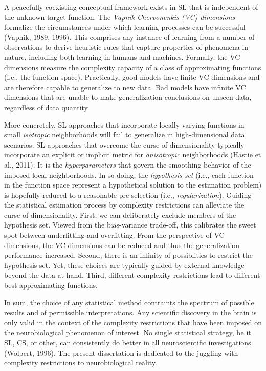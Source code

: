 \documentclass[authoryear,review,3p]{elsarticle}
\begin{document}
A peacefully coexisting conceptual framework exists in SL
that is independent
of the unknown target function.
The \textit{Vapnik-Chervonenkis (VC) dimensions}
formalize the circumstances
under which learning processes can be successful (Vapnik, 1989, 1996).
This comprises any instance of learning
from a number of observations
to derive heuristic rules that capture properties of phenomena in nature,
including both learning in humans and machines.
Formally, the VC dimensions measure the
complexity capacity of a class of approximating functions
(i.e., the function space). 
%
Practically, good models have finite VC dimensions
and are therefore capable to generalize to new data.
Bad models have infinite VC dimensions that
are unable to make generalization conclusions on unseen data,
regardless of data quantity.



More concretely,
SL approaches that incorporate locally varying functions
in small \textit{isotropic} neighborhoods
will fail to generalize in high-dimensional data scenarios.
SL approaches that overcome the curse of dimensionality typically
incorporate an explicit or implicit metric for
\textit{anisotropic} neighborhoods
(Hastie et al., 2011).
%
It is the \textit{hyperparameters} that govern the
smoothing behavior of the imposed local neighborhoods.
%
In so doing,
the \textit{hypothesis set} (i.e., each function in the function space
represent a hypothetical solution to
the estimation problem) is hopefully reduced to
a reasonable pre-selection (i.e., \textit{regularization}).
%
Guiding the statistical estimation process by
complexity restrictions can alleviate the curse of dimensionality.
First,
we can deliberately exclude members of the hypothesis set.
Viewed from the bias-variance trade-off, this calibrates
the sweet spot between underfitting and overfitting.
From the perspective of VC dimensions,
the VC dimensions can be reduced and thus the generalization performance
increased.
%
Second, there is an infinity of possiblities to restrict the hypothesis set.
Yet, these choices are typically guided by external knowledge beyond
the data at hand.
%
Third,
different complexity restrictions lead to different
best approximating functions.



In sum,
the choice of any statistical method contraints
the spectrum of possible results and of permissible interpretations.
Any scientific discovery in the brain is only valid in the
context of the complexity restrictions that have been imposed
on the neurobiological phenomenon of interest.
%
No single statistical strategy, be it SL, CS, or other,
can consistently
do better in all neuroscientific investigations
(Wolpert, 1996).
%
The present dissertation
is dedicated to the juggling with
complexity restrictions to
neurobiological reality.
\end{document}
